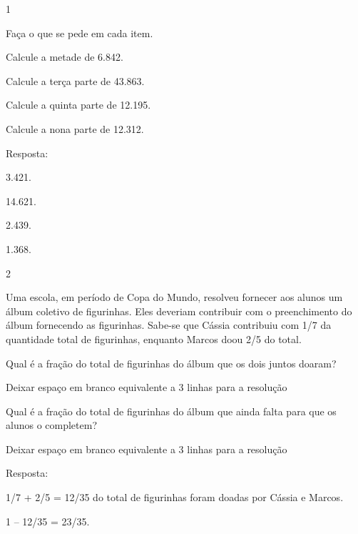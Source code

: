 \begin{mdframed}[linewidth=2pt,linecolor=salmao,roundcorner=2pt]
\begin{escolha}
{{

\num{1}

Faça o que se pede em cada item.

\begin{escolha}
\item
  Calcule a metade de 6.842.
\item
  Calcule a terça parte de 43.863.
\item
  Calcule a quinta parte de 12.195.
\item
  Calcule a nona parte de 12.312.
\end{escolha}

Resposta:

\begin{escolha}
\item
  3.421.
\item
  14.621.
\item
  2.439.
\item
  1.368.
\end{escolha}

\num{2}

Uma escola, em período de Copa do Mundo, resolveu fornecer aos alunos um
álbum coletivo de figurinhas. Eles deveriam contribuir com o
preenchimento do álbum fornecendo as figurinhas. Sabe-se que Cássia
contribuiu com 1/7 da quantidade total de figurinhas, enquanto Marcos
doou 2/5 do total.

\begin{escolha}
\item
  Qual é a fração do total de figurinhas do álbum que os dois juntos doaram?
\end{escolha}

Deixar espaço em branco equivalente a 3 linhas para a resolução

\begin{escolha}
\item
  Qual é a fração do total de figurinhas do álbum que ainda falta para que os
  alunos o completem?
\end{escolha}

Deixar espaço em branco equivalente a 3 linhas para a resolução

Resposta:

\begin{escolha}
\item
  1/7 + 2/5 = 12/35 do total de figurinhas foram doadas por Cássia e
  Marcos.
\item
  1 -- 12/35 = 23/35.
\end{escolha}

}}
\end{escolha}
\end{mdframed}
